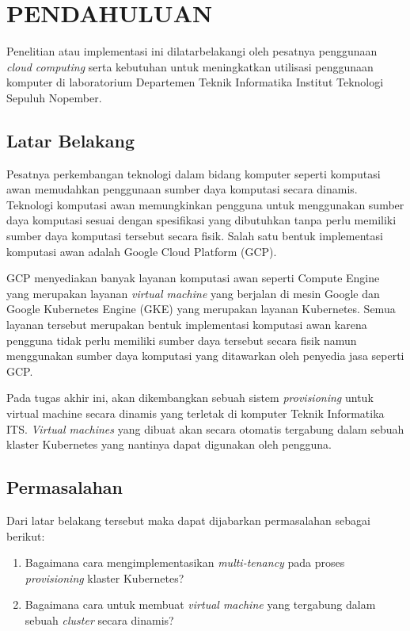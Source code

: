 \chapter{PENDAHULUAN}
\label{chap:pendahuluan}


Penelitian atau implementasi ini dilatarbelakangi oleh pesatnya
penggunaan \emph{cloud computing} serta kebutuhan untuk meningkatkan
utilisasi penggunaan komputer di laboratorium Departemen Teknik Informatika
Institut Teknologi Sepuluh Nopember.

\section{Latar Belakang}
\label{sec:latarbelakang}

Pesatnya perkembangan teknologi dalam bidang komputer
seperti komputasi awan memudahkan penggunaan sumber daya
komputasi secara dinamis. Teknologi komputasi awan memungkinkan
pengguna untuk menggunakan sumber daya komputasi sesuai dengan spesifikasi
yang dibutuhkan tanpa perlu memiliki sumber daya komputasi tersebut secara
fisik. Salah satu bentuk implementasi komputasi awan adalah
Google Cloud Platform (GCP).

GCP menyediakan banyak layanan komputasi awan seperti Compute Engine yang merupakan
layanan \emph{virtual machine} yang berjalan di mesin Google dan Google Kubernetes Engine (GKE)
yang merupakan layanan Kubernetes. Semua layanan tersebut merupakan bentuk implementasi
komputasi awan karena pengguna tidak perlu memiliki sumber daya tersebut secara
fisik namun menggunakan sumber daya komputasi yang ditawarkan oleh penyedia jasa seperti GCP.

Pada tugas akhir ini, akan dikembangkan sebuah sistem \emph{provisioning} untuk virtual machine
secara dinamis yang terletak di komputer Teknik Informatika ITS. \emph{Virtual machines}
yang dibuat akan secara otomatis tergabung dalam sebuah klaster Kubernetes yang nantinya
dapat digunakan oleh pengguna. 

\section{Permasalahan}
\label{sec:permasalahan}

Dari latar belakang tersebut maka dapat dijabarkan permasalahan sebagai berikut:

\begin{enumerate}[nolistsep]

  \item Bagaimana cara mengimplementasikan \emph{multi-tenancy} pada proses \emph{provisioning}
    klaster Kubernetes?

  \item Bagaimana cara untuk membuat \emph{virtual machine} yang tergabung
    dalam sebuah \emph{cluster} secara dinamis?

\end{enumerate}

